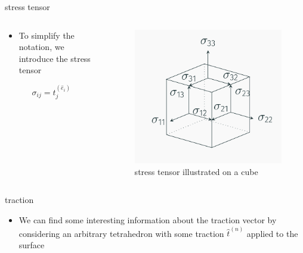 \documentclass[
  letterpaper,
  ignorenonframetext,
  aspectratio=43,
  handout,
  12pt]{beamer}
\providecommand{\tightlist}{%
  \setlength{\itemsep}{0pt}\setlength{\parskip}{0pt}}
\providecommand{\tightlist}{%
\setlength{\itemsep}{0pt}\setlength{\parskip}{0pt}}
\let\Oldincludegraphics\includegraphics
\renewcommand{\includegraphics}[2][]{\Oldincludegraphics[width=\textwidth,height=0.7\textheight,keepaspectratio]{#2}}
\begin{document}
\begin{frame}{stress tensor}
\protect\hypertarget{stress-tensor}{}
\begin{columns}[T]
\begin{column}{0.5\textwidth}
\begin{itemize}
\tightlist
\item
  To simplify the notation, we introduce the stress tensor
\end{itemize}

\[\sigma_{ij} = t_j^{(\hat{e}_i)}\]
\end{column}

\begin{column}{0.5\textwidth}
\begin{figure}
\centering
\includegraphics{../images/stress-cube.png}
\caption{stress tensor illustrated on a cube}
\end{figure}
\end{column}
\end{columns}
\end{frame}

\begin{frame}{traction}
\protect\hypertarget{traction}{}
\begin{itemize}
\tightlist
\item
  We can find some interesting information about the traction vector by
  considering an arbitrary tetrahedron with some traction
  \(\hat{t}^{(n)}\) applied to the surface
\end{itemize}
\end{frame}
\end{document}

